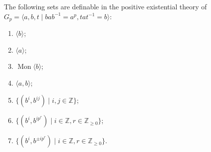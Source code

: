 \documentclass[10pt,a4paper]{amsart}
\DeclareMathOperator{\Mon}{Mon}
\newcommand{\Z}{\mathbb{Z}}
\begin{document}
\begin{lem}
	\label{defable}
	The following sets are definable in the positive existential theory of
	\(G_p = \langle a, b, t \mid bab^{-1} = a^p, tat^{-1} = b\rangle\): 
	\begin{enumerate}
			\item \(\langle b \rangle\);
					\label{item:b-defable}
			\item \(\langle a \rangle\);
					\label{item:a-defable}
			\item \(\Mon \langle b \rangle\);
					\label{item:mon-b-defable}
			\item \(\langle a, b \rangle\);
					\label{item:ab-defable}
			\item \(\{(b^i, b^{ij}) \mid i, j \in \Z\}\);
					\label{item:b-div-defable}
			\item \(\{(b^i, b^{i p^r}) \mid i \in \Z, r \in \Z_{\geq 0}\}\);
					\label{item:b-divp-pre-defable}
			\item \(\{(b^i, b^{\pm i p^r}) \mid i \in \Z, r \in \Z_{\geq 0}\}\).
					\label{item:b-divp-defable}
	\end{enumerate}
\end{lem}
\end{document}
